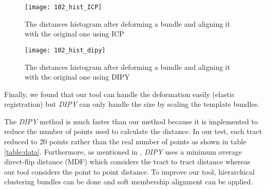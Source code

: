 \documentclass[../structure.tex]{subfiles}
\begin{document}
\begin{figure}[h!]
\centering
\texttt{[image: 102\_hist\_ICP]}
\captionsetup{justification=centering}
\caption{The distances histogram after deforming a bundle and aligning it with the original one using ICP}
\label{fig:hist_icp_def}
\end{figure}

\begin{figure}[h!]
\centering
\texttt{[image: 102\_hist\_dipy]}
\captionsetup{justification=centering}
\caption{The distances histogram after deforming a bundle and aligning it with the original one using DIPY}
\label{fig:hist_dipy_def}
\end{figure}

Finally, we found that our tool can handle the deformation easily (elastic registration) but \textit{DIPY} can only handle the size by scaling the template bundles.

The \textit{DIPY} method is much faster than our method because it is implemented to reduce the number of points used to calculate the distance. In our test, each tract reduced to 20 points rather than the real number of points as shown in table \ref{table:data}. Furthermore, as mentioned in \cite{Garyfallidis2012}, \textit{DIPY} uses a minimum average direct-flip distance (MDF) which considers the tract to tract distance whereas our tool considers the point to point distance. To improve our tool, hierarchical clustering bundles can be done and soft membership alignment can be applied.
\end{document}
